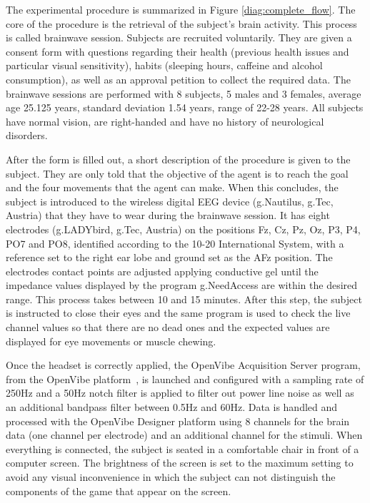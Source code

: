 \documentclass[journal]{IEEEtran}
\begin{document}
The experimental procedure is summarized in Figure \ref{diag:complete_flow}. The core of the procedure is the retrieval of the subject's brain activity.  This process is called brainwave session. Subjects are recruited voluntarily. They are given a consent form with questions regarding their health (previous health issues and particular visual sensitivity), habits (sleeping hours, caffeine and alcohol consumption), as well as an approval petition to collect the required data. The brainwave sessions are performed with 8 subjects, 5 males and 3 females, average age 25.125 years, standard deviation 1.54 years, range of 22-28 years. All subjects have normal vision, are right-handed and have no history of neurological disorders.

After the form is filled out, a short description of the procedure is given to the subject. They are only told that the objective of the agent is to reach the goal and the four movements that the agent can make. When this concludes, the subject is introduced to the wireless digital EEG device (g.Nautilus, g.Tec, Austria) that they have to wear during the brainwave session. It has eight electrodes (g.LADYbird, g.Tec, Austria) on the positions Fz, Cz, Pz, Oz, P3, P4, PO7 and PO8, identified according to the 10-20 International System, with a reference set to the right ear lobe and ground set as the AFz position. The electrodes contact points are adjusted applying conductive gel until the impedance values displayed by the program g.NeedAccess are within the desired range. This process takes between 10 and 15 minutes. After this step, the subject is instructed to close their eyes and the same program is used to check the live channel values so that there are no dead ones and the expected values are displayed for eye movements or muscle chewing.

Once the headset is correctly applied, the OpenVibe Acquisition Server program, from the OpenVibe platform~\cite{OPEN-VIBE-PAPER}, is launched and configured with a sampling rate of 250Hz and a 50Hz notch filter is applied to filter out power line noise as well as an additional bandpass filter between 0.5Hz and 60Hz. Data is handled and processed with the OpenVibe Designer platform using 8 channels for the brain data (one channel per electrode) and an additional channel for the stimuli. When everything is connected, the subject is seated in a comfortable chair in front of a computer screen. The brightness of the screen is set to the maximum setting to avoid any visual inconvenience in which the subject can not distinguish the components of the game that appear on the screen.
\end{document}
